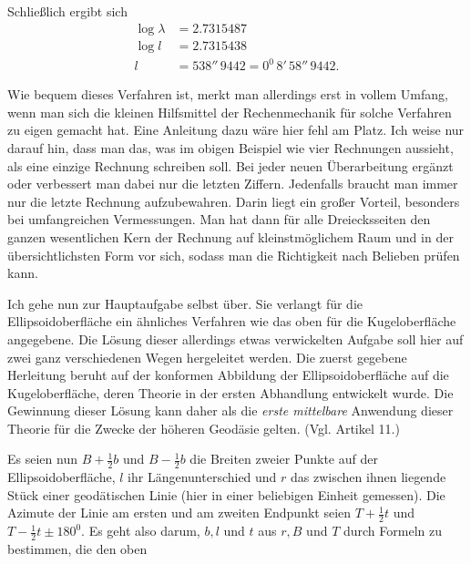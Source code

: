 %
Schließlich ergibt sich
\[
\begin{aligned}
\log\lambda&=2.7315487\\
\log l&=2.7315438\\
l&=538''\,9442=0^0\,8'\,58''\,9442.
\end{aligned}
\]

\indent Wie bequem dieses Verfahren ist, merkt man allerdings erst in vollem Umfang, wenn man sich die kleinen Hilfsmittel der Rechenmechanik für solche Verfahren zu eigen gemacht hat. Eine Anleitung dazu wäre hier fehl am Platz. Ich weise nur darauf hin, dass man das, was im obigen Beispiel wie vier Rechnungen aussieht, als eine einzige Rechnung schreiben soll. Bei jeder neuen Überarbeitung ergänzt oder verbessert man dabei nur die letzten Ziffern. Jedenfalls braucht man immer nur die letzte Rechnung aufzubewahren. Darin liegt ein großer Vorteil, besonders bei umfangreichen Vermessungen. Man hat dann für alle Dreiecksseiten den ganzen wesentlichen Kern der Rechnung auf kleinstmöglichem Raum und in der übersichtlichsten Form vor sich, sodass man die Richtigkeit nach Belieben prüfen kann.

Ich gehe nun zur Hauptaufgabe selbst über. Sie verlangt für die Ellipsoidoberfläche ein ähnliches Verfahren wie das oben für die Kugeloberfläche angegebene. Die Lösung dieser allerdings etwas verwickelten Aufgabe soll hier auf zwei ganz verschiedenen Wegen hergeleitet werden. Die zuerst gegebene Herleitung beruht auf der konformen Abbildung der Ellipsoidoberfläche auf die Kugeloberfläche, deren Theorie in der ersten Abhandlung entwickelt wurde. Die Gewinnung dieser Lösung kann daher als die \textit{erste mittelbare} Anwendung dieser Theorie für die Zwecke der höheren Geodäsie gelten. (Vgl. Artikel 11.)

Es seien nun \(B+\frac12b\) und \(B-\frac12b\) die Breiten zweier Punkte auf der Ellipsoidoberfläche, \(l\) ihr Längenunterschied und \(r\) das zwischen ihnen liegende Stück einer geodätischen Linie (hier in einer beliebigen Einheit gemessen). Die Azimute der Linie am ersten und am zweiten Endpunkt seien \(T+\frac12t\) und \(T-\frac12t\pm180^0\). Es geht also darum, \(b,l\) und \(t\) aus \(r,B\) und \(T\) durch Formeln zu bestimmen, die den oben
